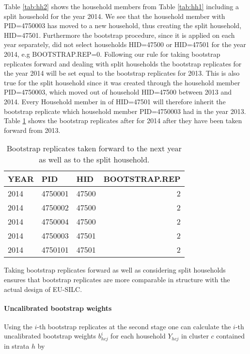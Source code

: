 \documentclass{scrartcl}\usepackage[]{graphicx}\usepackage[]{color}
\begin{document}
Table \ref{tab:hh2} shows the household members from Table \ref{tab:hh1} including a split household for the year 2014. We see that the household member with PID=4750003 has moved to a new household, thus creating the split household, HID=47501.
Furthermore the bootstrap procedure, since it is applied on each year separately, did not select households HID=47500 or HID=47501 for the year 2014, e.g BOOTSTRAP.REP=0.
Following our rule for taking bootstrap replicates forward and dealing with split households the bootstrap replicates for the year 2014 will be set equal to the bootstrap replicates for 2013. This is also true for the split household since it was created through the household member PID=4750003, which moved out of household HID=47500 between 2013 and 2014. Every Household member in of HID=47501 will therefore inherit the bootstrap replicate which household member PID=4750003 had in the year 2013. Table \ref{tab:hh3} shows the bootstrap replicates after for 2014 after they have been taken forward from 2013.

\begin{table}

\caption{\label{tab:hh3}Bootstrap replicates taken forward to the next year as well as to the split household.}
\centering
\begin{tabular}[t]{lllr}
\toprule
YEAR & PID & HID & BOOTSTRAP.REP\\
\midrule
2014 & 4750001 & 47500 & 2\\
2014 & 4750002 & 47500 & 2\\
2014 & 4750004 & 47500 & 2\\
2014 & 4750003 & 47501 & 2\\
2014 & 4750101 & 47501 & 2\\
\bottomrule
\end{tabular}
\end{table}



Taking bootstrap replicates forward as well as considering split households ensures that bootstrap replicates are more comparable in structure with the actual design of EU-SILC.

\paragraph{Uncalibrated bootstrap weights}
Using the $i$-th bootstrap replicates at the second stage one can calculate the $i$-th uncalibrated bootstrap weights $b_{hcj}^{i}$ for each household $Y_{hcj}$ in cluster $c$ contained in strata $h$ by
\end{document}
